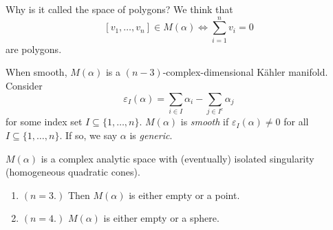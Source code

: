 Why is it called the space of polygons?
We think that
$$
[v_1,\ldots,v_n] \in M(\alpha) \iff \sum_{i=1}^nv_i=0
$$
are polygons.

When smooth, $M(\alpha)$ is a $(n-3)$-complex-dimensional
Kähler manifold. Consider
$$
\varepsilon_I(\alpha)=\sum_{i \in I}\alpha_i
-\sum_{j \in I^c}\alpha_j
$$
for some index set $I \subseteq \{1,\ldots, n\}$.
$M(\alpha)$ is {\it smooth} if $\varepsilon_I(\alpha)
\neq 0$ for all $I\subseteq \{1,\ldots,n\}$.
If so, we say $\alpha$ is {\it generic}.

\begin{theorem}
\label{theorem-Kapovich-Millson}
$M(\alpha)$ is a complex analytic space
with (eventually) isolated singularity
(homogeneous quadratic cones).
\end{theorem}

\begin{example}
\label{examples-polygon-moduli-spaces}
\begin{enumerate}
\item $(n=3.)$ Then $M(\alpha)$ is either empty or a point.

\item $(n=4.)$ $M(\alpha)$ is either empty or a sphere.
\end{enumerate}
\end{example}

